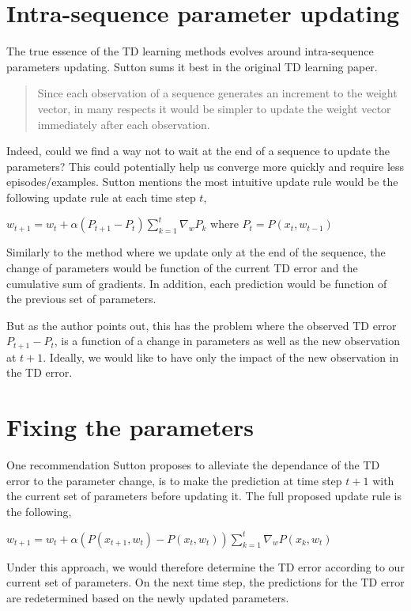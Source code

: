 \documentclass{article}
\begin{document}
\section{Intra-sequence parameter updating}

The true essence of the TD learning methods evolves around intra-sequence parameters updating. Sutton sums it best in the original TD learning paper.

\begin{quote}
  Since each observation of a sequence generates an increment to the weight vector, in many respects it would be simpler to update the weight vector immediately after each observation.
\end{quote}

Indeed, could we find a way not to wait at the end of a sequence to update the parameters? This could potentially help us converge more quickly and require less episodes/examples. Sutton mentions the most intuitive update rule would be the following update rule at each time step $t$,

$w_{t+1} = w_t + \alpha(P_{t+1} - P_t) \sum \limits_{k=1}^t \nabla_w P_k$ where $P_t = P(x_t, w_{t-1})$

Similarly to the method where we update only at the end of the sequence, the change of parameters would be function of the current TD error and the cumulative sum of gradients. In addition, each prediction would be function of the previous set of parameters.

But as the author points out, this has the problem where the observed TD error $P_{t+1} - P_t$, is a function of a change in parameters as well as the new observation at $t+1$. Ideally, we would like to have only the impact of the new observation in the TD error.

\section{Fixing the parameters}

One recommendation Sutton proposes to alleviate the dependance of the TD error to the parameter change, is to make the prediction at time step $t+1$ with the current set of parameters before updating it. The full proposed update rule is the following,

$w_{t+1} = w_t + \alpha(P(x_{t+1}, w_t) - P(x_t, w_t)) \sum \limits_{k=1}^t \nabla_w P(x_k, w_t)$

Under this approach, we would therefore determine the TD error according to our current set of parameters. On the next time step, the predictions for the TD error are redetermined based on the newly updated parameters.
\end{document}
